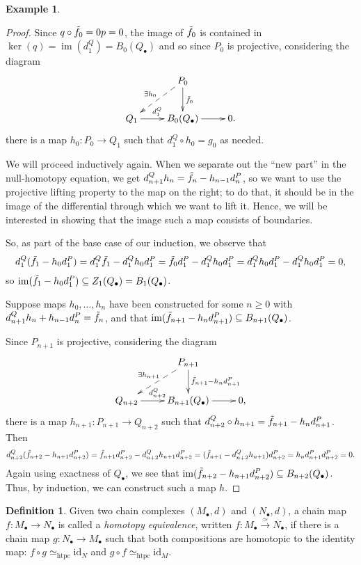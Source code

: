 \documentclass{amsart}[12pt]
\def\htpy{\simeq_{\mathrm{htpc}}}
\def\image{\operatorname{im}}
\def\im{\image}
\def\ker{\operatorname{ker}}
\newcommand{\id}{\mathrm{id}}
\newcommand{\DEF}[1]{\emph{#1}\index{#1}}
\numberwithin{equation}{section}
\theoremstyle{plain} %
\theoremstyle{definition}
\newtheorem{defn}[equation]{Definition}
\newtheorem{ex}[equation]{Example}
\theoremstyle{remark}
\newcommand{\xra}[1]{\xrightarrow{#1}}
\begin{document}
\begin{ex}
\begin{proof}
Since $q \circ \tilde{f}_0 = 0 p = 0$, the image of $\tilde{f}_0$ is contained in $\ker(q) = \im(d^Q_1)=B_0(Q_\bullet)$ and so since $P_0$ is projective, considering the diagram
$$
\xymatrix{
& P_0 \ar[d]^{\tf_0}   \ar@{-->}[dl]_{\exists h_0} \\
Q_1 \ar[r]^{d_1^Q} & B_0(Q_\bullet) \ar[r] & 0. \\
}
$$ there is a map $h_0: P_0 \to Q_1$ such 
that $d_1^Q \circ h_0 = g_0$ as needed. 

We will proceed inductively again. When we separate out the ``new part'' in the null-homotopy equation, we get $d^Q_{n+1} h_n = \tilde{f}_n - h_{n-1}  d^P_n$, so we want to use the projective lifting property to the map on the right; to do that, it should be in the image of the differential through which we want to lift it. Hence, we will be interested in showing that the image such a map consists of boundaries.

So, as part of the base case of our induction, we observe that
\[ d_1^Q(\tilde{f}_1 - h_0 d_1^P) = d_1^Q \tilde{f}_1 - d_1^Q h_0 d_1^P = \tilde{f}_0 d_1^P - d_1^Q h_0 d_1^P = d_1^Q h_0 d_1^P - d_1^Q h_0 d_1^P = 0,\]
so $\im(\tf_1 - h_0 d_1^P) \subseteq Z_1(Q_\bullet) = B_1(Q_\bullet)$.

Suppose maps $h_0, \dots, h_n$ have been constructed for some $n \geq 0$ with $ d^Q_{n+1} h_n + h_{n-1}  d^P_n=\tilde{f}_n $, and that $\im(\tf_{n+1} - h_n d^P_{n+1}) \subseteq B_{n+1}(Q_\bullet)$. 

Since $P_{n+1}$ is projective, considering the diagram
$$
\xymatrix{
& P_{n+1} \ar[d]^{\tf_{n+1}-h_n d^P_{n+1}}   \ar@{-->}[dl]_{\exists h_{n+1}} \\
Q_{n+2} \ar[r]^{d^Q_{n+2}} & B_{n+1}(Q_\bullet) \ar[r] & 0, \\
}
$$ there is a map $h_{n+1}: P_{n+1} \to Q_{n+2}$ such 
that $d_{n+2}^Q \circ h_{n+1} = \tilde{f}_{n+1}-h_n d^P_{n+1}$. Then
\[ d^Q_{n+2}(\tilde{f}_{n+2} - h_{n+1} d^P_{n+2}) = \tilde{f}_{n+1} d^P_{n+2} - d^Q_{n+2} h_{n+1} d^P_{n+2} = (\tilde{f}_{n+1} - d^Q_{n+2} h_{n+1}) d^P_{n+2} = h_n d^P_{n+1} d^P_{n+2} = 0.\]
Again using exactness of $Q_\bullet$, we see that $\im(\tf_{n+2} - h_{n+1} d^P_{n+2}) \subseteq B_{n+2}(Q_\bullet)$. Thus, by induction, we can construct such a map $h$.
\end{proof}

\begin{defn} Given two chain complexes $(M_\bullet, d)$ and $(N_\bullet, d)$, a chain map $f: M_\bullet \to N_\bullet$ is called a \DEF{homotopy equivalence}, written $f: M_\bullet \xra{\simeq}
  N_\bullet$, if there is a chain map $g: N_\bullet \to M_\bullet$ such 
that both compositions are homotopic to the identity map: $f \circ g \htpy \id_N$ and $g \circ f \htpy \id_M$. 
\end{defn}


\end{ex}
\end{document}
